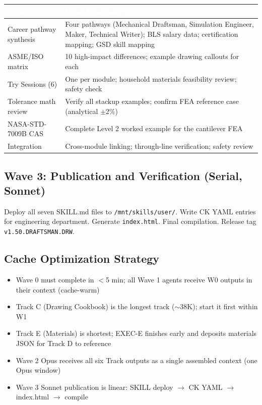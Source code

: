 \documentclass[11pt,letterpaper]{article}
\newcommand{\tableheader}[1]{\textbf{\sffamily\textcolor{white}{#1}}}
\begin{document}
\begin{center}
\begin{tabularx}{\textwidth}{L{3.5cm}X}
\toprule
{}
\tableheader{Task} & \tableheader{Opus Responsibility} \\
\midrule
Career pathway synthesis & Four pathways (Mechanical Draftsman, Simulation Engineer, Maker, Technical Writer); BLS salary data; certification mapping; GSD skill mapping \\
ASME/ISO matrix & 10 high-impact differences; example drawing callouts for each \\
Try Sessions (6) & One per module; household materials feasibility review; safety check \\
Tolerance math review & Verify all stackup examples; confirm FEA reference case (analytical $\pm$2\%) \\
NASA-STD-7009B CAS & Complete Level 2 worked example for the cantilever FEA \\
Integration & Cross-module linking; through-line verification; safety review \\
\bottomrule
\end{tabularx}
\end{center}

\subsection{Wave 3: Publication and Verification (Serial, Sonnet)}

Deploy all seven SKILL.md files to \texttt{/mnt/skills/user/}. Write CK YAML entries for engineering department. Generate \texttt{index.html}. Final compilation. Release tag \texttt{v1.50.DRAFTSMAN.DRW}.

\subsection{Cache Optimization Strategy}

\begin{itemize}[noitemsep]
  \item Wave 0 must complete in $<$5 min; all Wave 1 agents receive W0 outputs in their context (cache-warm)
  \item Track C (Drawing Cookbook) is the longest track ($\sim$38K); start it first within W1
  \item Track E (Materials) is shortest; EXEC-E finishes early and deposits materials JSON for Track D to reference
  \item Wave 2 Opus receives all six Track outputs as a single assembled context (one Opus window)
  \item Wave 3 Sonnet publication is linear: SKILL deploy $\to$ CK YAML $\to$ index.html $\to$ compile
\end{itemize}
\end{document}
